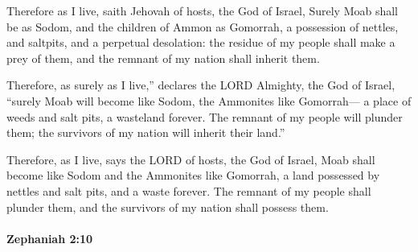 			\begin{versebox}
					\item[BHS] 
					\item[LXX] 
					\item[ASV] Therefore as I live, saith Jehovah of hosts, the God of Israel, Surely Moab shall be as Sodom, and the children of Ammon as Gomorrah, a possession of nettles, and saltpits, and a perpetual desolation: the residue of my people shall make a prey of them, and the remnant of my nation shall inherit them.
					\item[NIV] Therefore, as surely as I live,” declares the LORD Almighty, the God of Israel, “surely Moab will become like Sodom, the Ammonites like Gomorrah— a place of weeds and salt pits, a wasteland forever. The remnant of my people will plunder them; the survivors of my nation will inherit their land.”
					\item[NRSV] Therefore, as I live, says the LORD of hosts, the God of Israel, Moab shall become like Sodom and the Ammonites like Gomorrah, a land possessed by nettles and salt pits, and a waste forever. The remnant of my people shall plunder them, and the survivors of my nation shall possess them.
			\end{versebox}

		\paragraph{Zephaniah 2:10} %
			\label{ZEPHANIAH-2-10}

